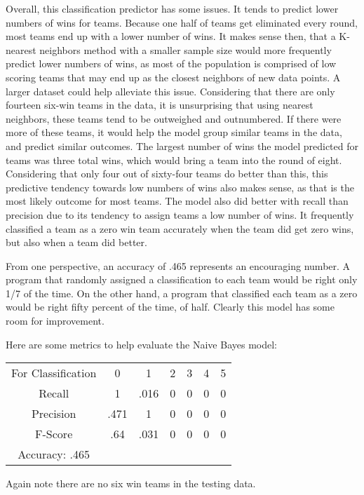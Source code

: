 \documentclass{article}
\begin{document}
Overall, this classification predictor has some issues. It tends to predict lower numbers of wins for teams. Because one half of teams get eliminated every round, most teams end up with a lower number of wins. It makes sense then, that a K-nearest neighbors method with a smaller sample size would more frequently predict lower numbers of wins, as most of the population is comprised of low scoring teams that may end up as the closest neighbors of new data points. A larger dataset could help alleviate this issue. Considering that there are only fourteen six-win teams in the data, it is unsurprising that using nearest neighbors, these teams tend to be outweighed and outnumbered. If there were more of these teams, it would help the model group similar teams in the data, and predict similar outcomes. The largest number of wins the model predicted for teams was three total wins, which would bring a team into the round of eight. Considering that only four out of sixty-four teams do better than this, this predictive tendency towards low numbers of wins also makes sense, as that is the most likely outcome for most teams. The model also did better with recall than precision due to its tendency to assign teams a low number of wins. It frequently classified a team as a zero win team accurately when the team did get zero wins, but also when a team did better. 

From one perspective, an accuracy of .465 represents an encouraging number. A program that randomly assigned a classification to each team would be right only 1/7 of the time. On the other hand, a program that classified each team as a zero would be right fifty percent of the time, of half. Clearly this model has some room for improvement. 

Here are some metrics to help evaluate the Naive Bayes model:

\begin{center}
\begin{tabular}{ c c c c c c c }
 For Classification & 0 & 1 & 2 & 3 & 4 & 5 \\
 Recall & 1 & .016 & 0 & 0 & 0 & 0 \\ 
 Precision & .471 & 1 & 0 & 0 & 0 & 0 \\  
 F-Score & .64 & .031 & 0 & 0 & 0 & 0  \\
 Accuracy: .465
\end{tabular}
\end{center}


Again note there are no six win teams in the testing data. 
\end{document}
